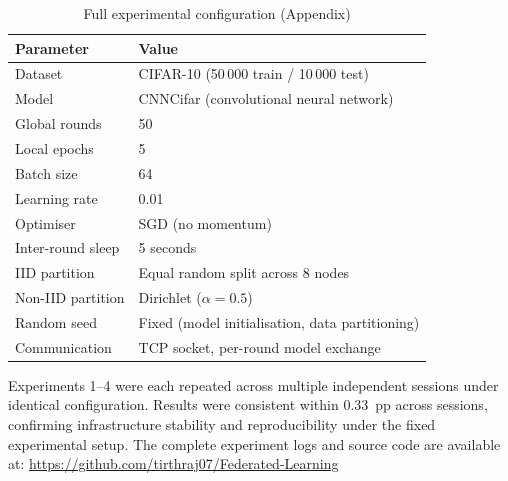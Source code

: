 \documentclass[12pt]{report}
\begin{document}
\begin{table}[H]
\centering
\caption{Full experimental configuration (Appendix)}
\label{tab:hyperparams-appendix}
\begin{tabular}{ll}
\toprule
\textbf{Parameter} & \textbf{Value} \\
\midrule
Dataset            & CIFAR-10 (50\,000 train / 10\,000 test) \\
Model              & CNNCifar (convolutional neural network) \\
Global rounds      & 50 \\
Local epochs       & 5 \\
Batch size         & 64 \\
Learning rate      & 0.01 \\
Optimiser          & SGD (no momentum) \\
Inter-round sleep  & 5 seconds \\
IID partition      & Equal random split across 8 nodes \\
Non-IID partition  & Dirichlet ($\alpha = 0.5$) \\
Random seed        & Fixed (model initialisation, data partitioning) \\
Communication      & TCP socket, per-round model exchange \\
\bottomrule
\end{tabular}
\end{table}

\noindent Experiments 1--4 were each repeated across multiple independent
sessions under identical configuration. Results were consistent within
0.33~pp across sessions, confirming infrastructure stability and
reproducibility under the fixed experimental setup. The complete experiment
logs and source code are available at:
\url{https://github.com/tirthraj07/Federated-Learning}

\end{document}
